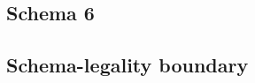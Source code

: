 
\subsection{Schema 6}\label{subsec:schema-6}


\subsection{Schema-legality boundary}\label{subsec:schema-legality-not-existence}

